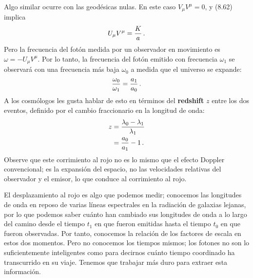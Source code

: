 \documentclass[11pt,b5paper,openany,twoside]{book}
\begin{document}
Algo similar ocurre con las geodésicas nulas.
En este caso $V_\mu V^\mu =0$, y (8.62) implica
\begin{equation}
U_\mu V^\mu = {{K}\over{a}}\,.\label{8.65}
\end{equation}
Pero la frecuencia del fotón medida por un observador en movimiento es $\omega=-U_\mu V^\mu$.
Por lo tanto, la frecuencia del fotón emitido con frecuencia $\omega_1$ se observará con una frecuencia más baja $\omega_0$ a medida que el universo se expande:
\begin{equation}
{{\omega_0}\over{\omega_1}} = {{a_1}\over {a_0}}\,.\label{8.66}
\end{equation}
A los cosmólogos les gusta hablar de esto en términos del {\bf redshift} $z$ entre los dos eventos, definido por el cambio fraccionario en la longitud de onda:
\begin{align}
z  &=  {{\lambda_0-\lambda_1}\over{\lambda_1}} \notag \\
&=  {{a_0}\over {a_1}}-1\,.\label{8.67}
\end{align}
Observe que este corrimiento al rojo no es lo mismo que el efecto Doppler convencional; es la expansión del espacio, no las velocidades relativas del observador y el emisor, lo que conduce al corrimiento al rojo.

El desplazamiento al rojo es algo que podemos medir; conocemos las longitudes de onda en reposo de varias líneas espectrales en la radiación de galaxias lejanas, por lo que podemos saber cuánto han cambiado sus longitudes de onda a lo largo del camino desde el tiempo $t_1$ en que fueron emitidas hasta el tiempo $t_0$ en que fueron observadas.
Por tanto, conocemos la relación de los factores de escala en estos dos momentos.
Pero no conocemos los tiempos mismos; los fotones no son lo suficientemente inteligentes como para decirnos cuánto tiempo coordinado ha transcurrido en su viaje.
Tenemos que trabajar más duro para extraer esta información.
\end{document}
